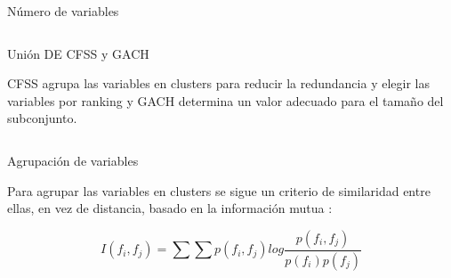 \documentclass[final]{beamer}
\newlength{\onecolwid}
\newlength{\twocolwid}
\begin{document}
\begin{frame}[t]
\begin{columns}[t]
\begin{column}{\twocolwid}
\begin{columns}[t,totalwidth=\twocolwid]
\begin{column}{\onecolwid}
\begin{block}{Número de variables}
\end{block}


\end{column} %

\end{columns} %


\begin{alertblock}{Unión DE CFSS y GACH}

CFSS agrupa las variables en clusters para reducir la redundancia y elegir las variables por ranking y GACH determina un valor adecuado para el tamaño del subconjunto.

\end{alertblock} 


\begin{columns}[t,totalwidth=\twocolwid] %

\begin{column}{\onecolwid} %


\begin{block}{Agrupación de variables}

Para agrupar las variables en clusters se sigue un criterio de similaridad entre ellas, en vez de distancia, basado en la información mutua \cite{cover1991}:
  
\begin{equation}
I(f_{i},f_{j}) = \sum \sum p(f_{i},f_{j}) log \frac{p(f_{i},f_{j})}{p(f_{i})p(f_{j})}
\label{eqn:MI}
\end{equation}


\end{block}
\end{column}
\end{columns}
\end{column}
\end{columns}
\end{frame}
\end{document}
